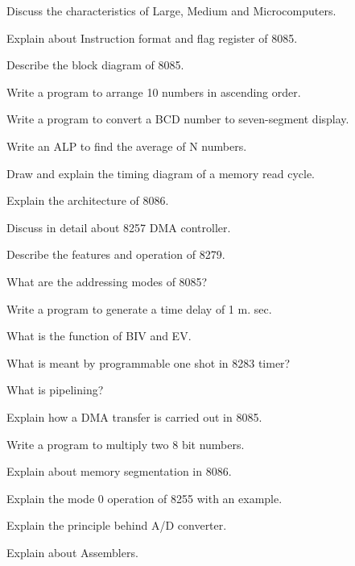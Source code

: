 \markB
\partC

\item \iitem Discuss the characteristics of Large, Medium and Microcomputers. 
\item Explain about Instruction format and flag register of 8085. 
\ene
\Or
\item Describe the block diagram of 8085.

\item Write a program to arrange 10 numbers in ascending order.
\Or
\item Write a program to convert a BCD number to seven-segment display.

\newpage \again

\item 
\iitem Write an ALP to find the average of N numbers. 
\item Draw and explain the timing diagram of a memory read cycle. 
\ene
\Or
\item Explain the architecture of 8086.

\item Discuss in detail about 8257 DMA controller.
\Or
\item Describe the features and operation of 8279.

\markC
\ene

\newpage

\sub{\subj}
\maxtime

\partA

\iitem What are the addressing modes of 8085?
\item Write a program to generate a time delay of 1 m. sec.
\item What is the function of BIV and EV.
\item What is meant by programmable one shot in 8283 timer?
\item What is pipelining?

\markA
\partB

\item Explain how a DMA transfer is carried out in 8085.
\item Write a program to multiply two 8 bit numbers.
\item Explain about memory segmentation in 8086.
\item Explain the mode 0 operation of 8255 with an example.
\item Explain the principle behind A/D converter.
\item Explain about Assemblers.


